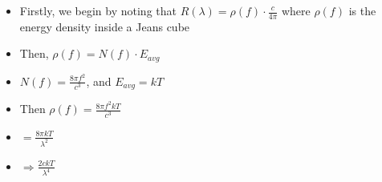 \documentclass{article}
\begin{document}

\begin{itemize}
    \item Firstly, we begin by noting that \(R(\lambda)=\rho(f)\cdot\frac{c}{4\pi}\) where \(\rho(f)\) is the energy density inside a Jeans cube
    \item Then, \(\rho(f)=N(f)\cdot E_{avg}\) 
    \item \(N(f)=\frac{8\pi f^2}{c^3}\), and \(E_{avg} = kT\)
    \item Then \(\rho(f)=\frac{8\pi f^2kT}{c^3}\)
    \item \(=\frac{8\pi kT}{\lambda^2}\)
    \item \(\Rightarrow\boxed{\frac{2ckT}{\lambda^4}}\)
\end{itemize}


\end{document}
